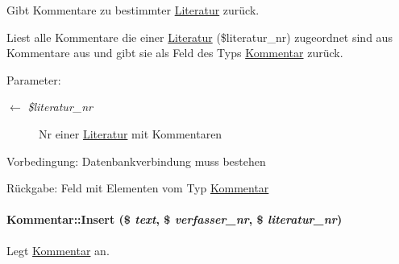 Gibt Kommentare zu bestimmter \hyperlink{classLiteratur}{Literatur} zurück. 

Liest alle Kommentare die einer \hyperlink{classLiteratur}{Literatur} (\$literatur\_\-nr) zugeordnet sind aus Kommentare aus und gibt sie als Feld des Typs \hyperlink{classKommentar}{Kommentar} zurück. \begin{Desc}
\item[Parameter:]
\begin{description}
\item[\mbox{$\leftarrow$} {\em \$literatur\_\-nr}]Nr einer \hyperlink{classLiteratur}{Literatur} mit Kommentaren \end{description}
\end{Desc}
\begin{Desc}
\item[Vorbedingung:]Datenbankverbindung muss bestehen \end{Desc}
\begin{Desc}
\item[R\"{u}ckgabe:]Feld mit Elementen vom Typ \hyperlink{classKommentar}{Kommentar} \end{Desc}
\hypertarget{classKommentar_6119b3c12a61d8d5a41cded165517914}{
\paragraph[Insert]{\setlength{\rightskip}{0pt plus 5cm}Kommentar::Insert (\$ {\em text}, \$ {\em verfasser\_\-nr}, \$ {\em literatur\_\-nr})}\hfill}
\label{classKommentar_6119b3c12a61d8d5a41cded165517914}


Legt \hyperlink{classKommentar}{Kommentar} an. 

